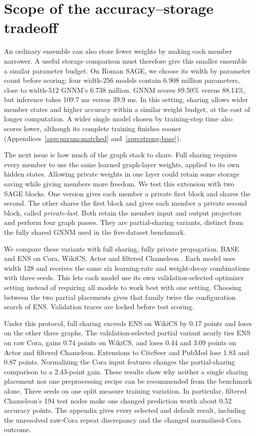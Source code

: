 \documentclass{article}
\begin{document}
\section{Scope of the accuracy--storage tradeoff}\label{sec:additional}
An ordinary ensemble can also store fewer weights by making each member narrower. A useful storage comparison must therefore give this smaller ensemble a similar parameter budget. On Roman SAGE, we choose its width by parameter count before scoring: four width-256 models contain 6.908 million parameters, close to width-512 GNNM's 6.738 million. GNNM scores 89.50\% versus 88.14\%, but inference takes 109.7 ms versus 39.9 ms. In this setting, sharing allows wider member states and higher accuracy within a similar weight budget, at the cost of longer computation. A wider single model chosen by training-step time also scores lower, although its complete training finishes sooner (Appendices~\ref{app:param-matched} and~\ref{app:strong-base}).

The next issue is how much of the graph stack to share. Full sharing requires every member to use the same learned graph-layer weights, applied to its own hidden states. Allowing private weights in one layer could retain some storage saving while giving members more freedom. We test this extension with two SAGE blocks. One version gives each member a private first block and shares the second. The other shares the first block and gives each member a private second block, called \emph{private-last}. Both retain the member input and output projectors and perform four graph passes. They are partial-sharing variants, distinct from the fully shared GNNM used in the five-dataset benchmark.

We compare these variants with full sharing, fully private propagation, BASE and ENS on Cora, WikiCS, Actor and filtered Chameleon \citep{yang2016revisiting,mernyei2020wikics,pei2020geomgcn,platonov2023critical}. Each model uses width 128 and receives the same six learning-rate and weight-decay combinations with three seeds. This lets each model use its own validation-selected optimizer setting instead of requiring all models to work best with one setting. Choosing between the two partial placements gives that family twice the configuration search of ENS. Validation traces are locked before test scoring.

Under this protocol, full sharing exceeds ENS on WikiCS by 0.17 points and loses on the other three graphs. The validation-selected partial variant nearly ties ENS on raw Cora, gains 0.74 points on WikiCS, and loses 0.44 and 3.09 points on Actor and filtered Chameleon. Extensions to CiteSeer and PubMed lose 1.83 and 0.87 points. Normalizing the Cora input features changes the partial-sharing comparison to a 2.43-point gain. These results show why neither a single sharing placement nor one preprocessing recipe can be recommended from the benchmark alone. Three seeds on one split measure training variation. In particular, filtered Chameleon's 194 test nodes make one changed prediction worth about 0.52 accuracy points. The appendix gives every selected and default result, including the unresolved raw-Cora repeat discrepancy and the changed normalized-Cora outcome.
\end{document}
